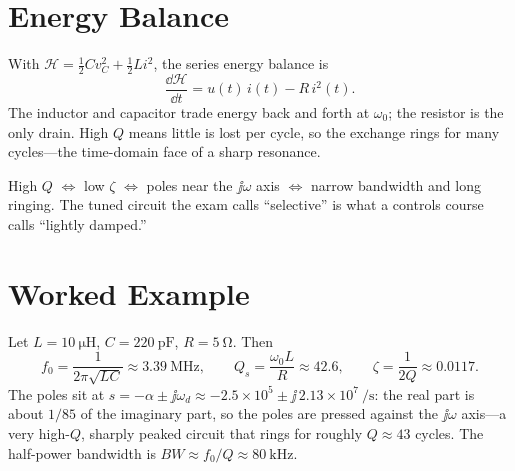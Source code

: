 \section{Energy Balance}
With \(\mathcal{H}=\tfrac12 Cv_C^2+\tfrac12 Li^2\), the series energy balance is
\[
\frac{\dd\mathcal{H}}{\dd t}=u(t)\,i(t)-R\,i^2(t).
\]
The inductor and capacitor trade energy back and forth at \(\omega_0\); the
resistor is the only drain. High \(Q\) means little is lost per cycle, so the
exchange rings for many cycles---the time-domain face of a sharp resonance.

\begin{controlsbox}
High \(Q\) \(\Leftrightarrow\) low \(\zeta\) \(\Leftrightarrow\) poles near the
\(\jj\omega\) axis \(\Leftrightarrow\) narrow bandwidth and long ringing. The tuned
circuit the exam calls ``selective'' is what a controls course calls ``lightly
damped.''
\end{controlsbox}

\section{Worked Example}
Let \(L=\SI{10}{\micro\henry}\), \(C=\SI{220}{\pico\farad}\), \(R=\SI{5}{\ohm}\).
Then
\[
f_0=\frac{1}{2\pi\sqrt{LC}}\approx\SI{3.39}{\mega\hertz},
\qquad
Q_s=\frac{\omega_0 L}{R}\approx 42.6,
\qquad
\zeta=\frac{1}{2Q}\approx0.0117.
\]
The poles sit at \(s=-\alpha\pm\jj\omega_d\approx-2.5\times10^5\pm\jj\,2.13\times10^7\ \si{\per\second}\):
the real part is about \(1/85\) of the imaginary part, so the poles are pressed
against the \(\jj\omega\) axis---a very high-\(Q\), sharply peaked circuit that
rings for roughly \(Q\approx43\) cycles. The half-power bandwidth is
\(BW\approx f_0/Q\approx\SI{80}{\kilo\hertz}\).
